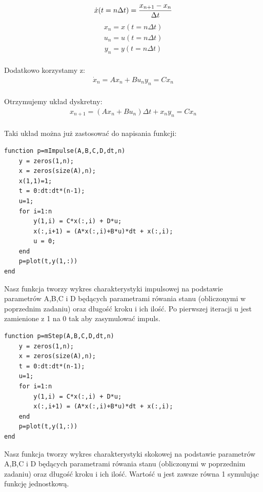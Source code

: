 \documentclass[a4paper,10pt]{article}
\begin{document}
\begin{itemize}
	\begin{eqnarray} 
		\dot{x}(t=n \Delta t ) = {x_{n+1}-x_{n} \over {\Delta t}}
	\end{eqnarray}
	\begin{eqnarray} 
		x_{n}=x(t=n \Delta t)
	\end{eqnarray}
	\begin{eqnarray} 
		u_{n}=u(t=n \Delta t)
	\end{eqnarray}
	\begin{eqnarray} 
		y_{n}=y(t=n \Delta t)
	\end{eqnarray}\\
	Dodatkowo korzystamy z:\\
	\begin{eqnarray} 
		\nonumber \dot{x}_{n}=Ax_{n}+Bu_{n}
		\nonumber y_{n}=Cx_{n}
	\end{eqnarray}\\
	Otrzymujemy układ dyskretny:\\
	\begin{eqnarray} 
		\nonumber {x}_{n+1}=(Ax_{n}+Bu_{n}) \Delta t +x_{n}
		\nonumber y_{n}=Cx_{n}
	\end{eqnarray}\\
	Taki układ można już zastosować do napisania funkcji:
\begin{lstlisting}[caption=funkcja mImpulse.m]
function p=mImpulse(A,B,C,D,dt,n)
	y = zeros(1,n);
	x = zeros(size(A),n);
	x(1,1)=1;
	t = 0:dt:dt*(n-1);
	u=1;
	for i=1:n
		y(1,i) = C*x(:,i) + D*u;
		x(:,i+1) = (A*x(:,i)+B*u)*dt + x(:,i);
		u = 0;
	end
	p=plot(t,y(1,:))
end
\end{lstlisting}
Nasz funkcja tworzy wykres charakterystyki impulsowej na podstawie parametrów A,B,C i D będących parametrami rówania stanu (obliczonymi w poprzednim zadaniu) oraz długość kroku i ich ilość. Po pierwszej iteracji u jest zamienione z 1 na 0 tak aby zasymulować impuls.

\begin{lstlisting}[caption=funkcja mStep.m]
function p=mStep(A,B,C,D,dt,n)
	y = zeros(1,n);
	x = zeros(size(A),n);
	t = 0:dt:dt*(n-1);
	u=1;
	for i=1:n
		y(1,i) = C*x(:,i) + D*u;
		x(:,i+1) = (A*x(:,i)+B*u)*dt + x(:,i);
	end
	p=plot(t,y(1,:))
end
\end{lstlisting}
Nasz funkcja tworzy wykres charakterystyki skokowej na podstawie parametrów A,B,C i D będących parametrami rówania stanu (obliczonymi w poprzednim zadaniu) oraz długość kroku i ich ilość. Wartość u jest zawsze równa 1 symulując funkcję jednostkową.


\end{itemize}
\end{document}
